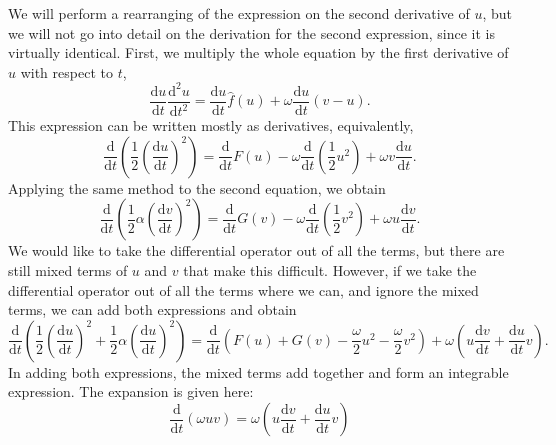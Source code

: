 We will perform a rearranging of the expression on the second derivative of $u$,
but we will not go into detail on the derivation for the second expression,
since it is virtually identical.
First, we multiply the whole equation by the first derivative of $u$ with respect to $t$,
\begin{equation*}
    \frac{\mathrm{d}u}{\mathrm{d}t}\frac{\mathrm{d}^2 u}{\mathrm{d}t^2} = \frac{\mathrm{d}u}{\mathrm{d}t}\hat{f}(u) + \omega \frac{\mathrm{d}u}{\mathrm{d}t}(v-u).
\end{equation*}
This expression can be written mostly as derivatives, equivalently,
\begin{equation*}
    \frac{\mathrm{d}}{\mathrm{d}t}\left(
        \frac{1}{2}\left(\frac{\mathrm{d}u}{\mathrm{d}t}\right)^2
     \right) = \frac{\mathrm{d}}{\mathrm{d}t}F(u) - \omega\frac{\mathrm{d}}{\mathrm{d}t}\left(\frac{1}{2}u^2\right) + \omega v \frac{\mathrm{d}u}{\mathrm{d}t}.
\end{equation*}
Applying the same method to the second equation, we obtain
\begin{equation*}
    \frac{\mathrm{d}}{\mathrm{d}t}\left(
        \frac{1}{2}\alpha\left(\frac{\mathrm{d}v}{\mathrm{d}t}\right)^2
    \right) = \frac{\mathrm{d}}{\mathrm{d}t}G(v) - \omega\frac{\mathrm{d}}{\mathrm{d}t}\left( \frac{1}{2}v^2 \right) + \omega u \frac{\mathrm{d}v}{\mathrm{d}t}.
\end{equation*}
We would like to take the differential operator out of all the terms, but there are still mixed terms of $u$ and $v$ that make this difficult.
However, if we take the differential operator out of all the terms where we can, and ignore the mixed terms, we can add both expressions and obtain
\begin{equation*}
    \frac{\mathrm{d}}{\mathrm{d}t}\left(
        \frac{1}{2}\left(\frac{\mathrm{d}u}{\mathrm{d}t}\right)^2 + \frac{1}{2}\alpha\left(\frac{\mathrm{d}u}{\mathrm{d}t}\right)^2
    \right) = \frac{\mathrm{d}}{\mathrm{d}t}\left(
        F(u) + G(v) - \frac{\omega}{2}u^2 -\frac{\omega}{2}v^2
    \right) + \omega \left(
        u \frac{\mathrm{d}v}{\mathrm{d}t} + \frac{\mathrm{d}u}{\mathrm{d}t}v
    \right).
\end{equation*}
In adding both expressions, the mixed terms add together and form an integrable expression.
The expansion is given here:
\begin{equation*}
    \frac{\mathrm{d}}{\mathrm{d}t}(\omega uv) = \omega \left( u \frac{\mathrm{d}v}{\mathrm{d}t} + \frac{\mathrm{d}u}{\mathrm{d}t} v \right)
\end{equation*}
